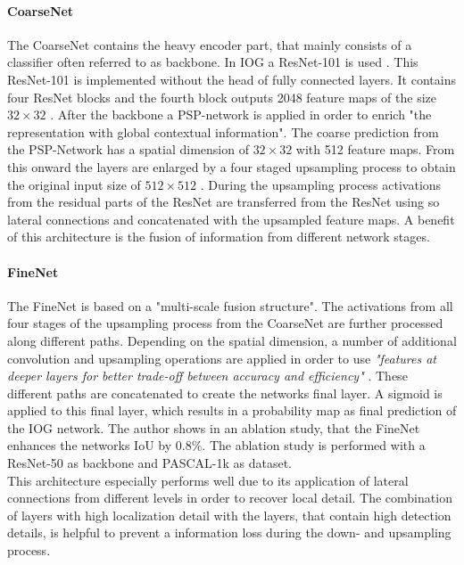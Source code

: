 \paragraph{CoarseNet}
The CoarseNet contains the heavy encoder part, that mainly consists of a classifier often referred to as backbone. In IOG a ResNet-101 \cite{He16ResNet} is used .
This ResNet-101 is implemented without the head of fully connected layers. It contains four ResNet blocks and the fourth block outputs 2048 feature maps of the size $32 \times 32$ .
After the backbone a PSP-network is applied in order to enrich "the representation with global contextual information"\cite{Zha20IOG}.
The coarse prediction from the PSP-Network \cite{Zhao2017pyramid} has a spatial dimension of  $32 \times 32$  with 512 feature maps. 
From this onward the layers are enlarged by a four staged upsampling process to obtain the original input size of  $512 \times 512$ . 
During the upsampling process activations from the residual parts of the ResNet are transferred from the ResNet using so lateral connections and concatenated with the upsampled feature maps.
A benefit of this architecture is the fusion of information from different network stages.

\paragraph{FineNet}
The FineNet is based on a "multi-scale fusion structure"\cite{Zha20IOG}. 
The activations from all four stages of the upsampling process from the CoarseNet are further processed along different paths. 
Depending on the spatial dimension, a number of additional convolution and upsampling operations are applied in order to use \emph{"features at deeper layers for better trade-off between accuracy and efficiency"} \cite[p. 12237]{Zha20IOG}.
These different paths are concatenated to create the networks final layer.
A sigmoid is applied to this final layer, which results in a probability map as final prediction of the IOG network.
The author shows in an ablation study, that the FineNet enhances the networks IoU by $0.8\%$. 
The ablation study is performed with a ResNet-50 as backbone and PASCAL-1k \cite{PASCAL10} as dataset. 
\\
This architecture especially performs well due to its application of lateral connections from different levels in order to recover local detail.
The combination of layers with high localization detail with the layers, that contain high detection details, is helpful to prevent a information loss during the down- and upsampling process.

